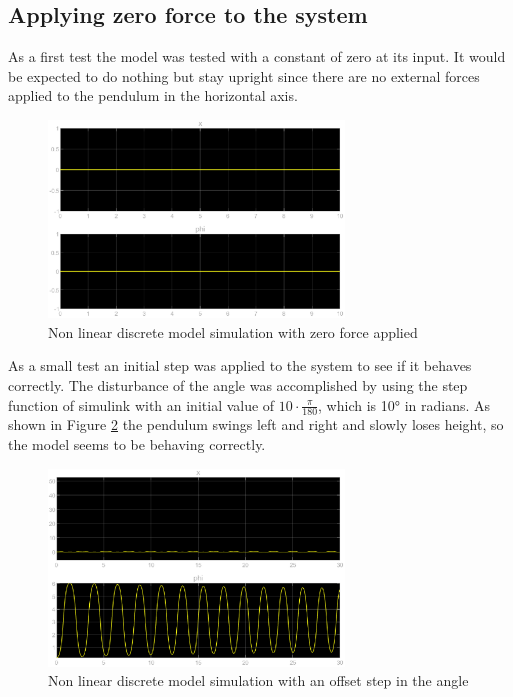 \subsection{Applying zero force to the system}
As a first test the model was tested with a constant of zero at its input. It would be expected to do nothing but stay upright since there are no external forces applied to the pendulum in the horizontal axis.	

\begin{figure}[H]
		\centering
		\includegraphics[width=0.7\textwidth]{figures/non_lin_disc_no_force.eps}
		\caption{Non linear discrete model simulation with zero force applied}
		\label{fig:non_linear_continuous}
\end{figure}
As a small test an initial step was applied to the system to see if it behaves correctly. The disturbance of the angle was accomplished by using the step function of simulink with an initial value of $10\cdot \frac{\pi}{180}$, which is 10° in radians.
As shown in Figure \ref{fig:sim_with_offset} the pendulum swings left and right and slowly loses height, so the model seems to be behaving correctly.
\begin{figure}[H]
		\centering
		\includegraphics[width=0.7\textwidth]{figures/non_lin_disc_no_force_offset.eps}
		\caption{Non linear discrete model simulation with an offset step in the angle}
		\label{fig:sim_with_offset}
\end{figure}


